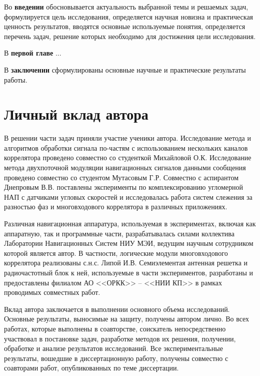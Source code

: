 Во \textbf{введении} обосновывается актуальность выбранной темы и решаемых задач, формулируется цель исследования, определяется научная новизна и практическая ценность результатов, вводятся основные используемые понятия, определяется перечень задач, решение которых необходимо для достижения цели исследования.

В \textbf{первой главе} ...

В \textbf{заключении} сформулированы основные научные и практические результаты работы.

\section*{Личный вклад автора}

В решении части задач приняли участие ученики автора. 
Исследование метода и алгоритмов обработки сигнала по-частям с использованием нескольких каналов коррелятора проведено совместно со студенткой Михайловой О.К.
Исследование метода двухпоточной модуляции навигационных сигналов данными сообщения проведено совместно со студентом Мутасовым Г.Р.
Совместно с аспирантом Днепровым В.В. поставлены эксперименты по комплексированию угломерной НАП с датчиками угловых скоростей и исследовалась работа систем слежения за разностью фаз и многовходового коррелятора в различных приложениях. 

Различная навигационная аппаратура, используемая в экспериментах, включая как аппаратную, так и программные части, разрабатывалась силами коллектива Лаборатории Навигационных Систем НИУ МЭИ, ведущим научным сотрудником которой является автор. 
В частности, логические модули многовходового коррелятора реализованы с.н.с. Липой И.В.
Семиэлементая антенная решетка и радиочастотный блок к ней, используемые в части экспериментов, разработаны и предоставлены филиалом  АО <<ОРКК>> -- <<НИИ КП>> в рамках проводимых совместных работ. 

Вклад автора заключается в выполнении основного объема исследований.
Основные результаты, выносимые на защиту, получены автором лично. 
Во всех работах, которые выполнены в соавторстве, соискатель непосредственно участвовал в постановке задач, разработке методов их решения, получении, обработке и анализе результатов исследований. Все экспериментальные результаты, вошедшие в диссертационную работу, получены совместно с соавторами работ, опубликованных по теме диссертации.


